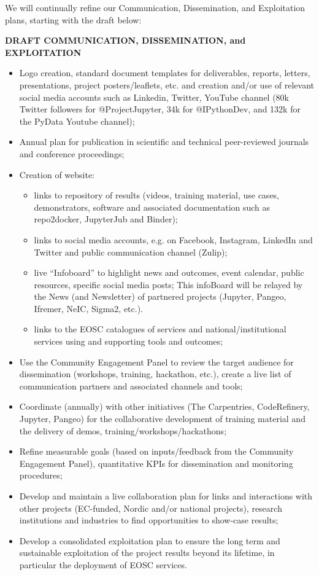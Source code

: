 We will continually refine our Communication, Dissemination, and Exploitation plans, starting with the draft below:
\label{box:draft-C-D-E-plan}
\begin{framed}

  \centerline{\textbf{ \TheProject DRAFT COMMUNICATION, DISSEMINATION, and EXPLOITATION}}
  {
  \begin{itemize}

\item Logo creation, standard document templates for deliverables, reports, letters, presentations, project posters/leaflets, etc. and creation and/or use of relevant social media accounts such as Linkedin, Twitter, YouTube channel (80k Twitter followers for @ProjectJupyter, 34k for @IPythonDev, and 132k for the PyData Youtube channel);
\item Annual plan for publication in scientific and technical peer-reviewed journals and conference proceedings;
\item Creation of \TheProject website:
\begin{itemize}
\item links to \TheProject repository of results (videos, training material, use cases, demonstrators, software and associated documentation such as repo2docker, JupyterJub and Binder);
\item links to social media accounts, e.g. on Facebook, Instagram, LinkedIn and Twitter and public communication channel (Zulip);
\item live “Infoboard” to highlight news and outcomes, event calendar, public resources, specific social media posts; This infoBoard will be relayed by the News (and Newsletter) of partnered projects (Jupyter, Pangeo, Ifremer, NeIC, Sigma2, etc.).
\item links to the EOSC catalogues of services and national/institutional
  services using and supporting \TheProject{} tools and outcomes;
\end{itemize}
\item Use the Community Engagement Panel to review the target audience for dissemination (workshops, training, hackathon, etc.), create a live list of communication partners and associated channels and tools;
\item Coordinate (annually) with other initiatives (The Carpentries, CodeRefinery, Jupyter, Pangeo) for the collaborative development of training material and the delivery of demos, training/workshops/hackathons;
\item Refine measurable goals (based on inputs/feedback from the Community
  Engagement Panel), quantitative KPIs for dissemination and monitoring procedures;
\item Develop and maintain a live collaboration plan for links and interactions with other projects (EC-funded, Nordic and/or national projects), research institutions and industries to find opportunities to show-case \TheProject results;
\item Develop a consolidated exploitation plan to ensure the long term and sustainable exploitation of the project results beyond its lifetime, in particular the deployment of EOSC services.
    \end{itemize}
}
\end{framed}

